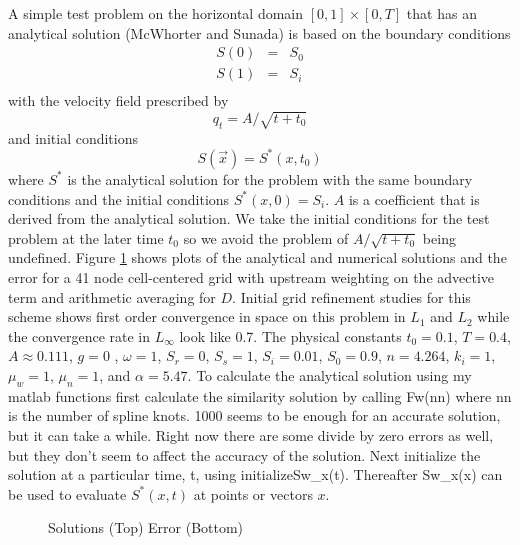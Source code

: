 \documentclass[12pt,dvips]{report}
\begin{document}
\begin{figure}
 
\end{figure}
\newpage
A simple test problem on the horizontal domain $[0,1] \times [0,T]$
that has an analytical solution (McWhorter and Sunada) is based on the
boundary conditions
\begin{eqnarray}
S(0) &=& S_0 \\
S(1) &=& S_i \\
\end{eqnarray}
with the velocity field prescribed by 
\begin{equation}
q_t = A/\sqrt{t+t_0}
\end{equation}
and initial conditions
\begin{equation}
S(\vec x) = S^{*}(x,t_0)
\end{equation}
where $S^{*}$ is the analytical solution for the problem with the same
boundary conditions and the initial conditions $S^{*}(x,0) = S_i$. $A$
is a coefficient that is derived from the analytical solution. We take
the initial conditions for the test problem at the later time $t_0$ so
we avoid the problem of $A/\sqrt{t+t_0}$ being undefined. Figure
\ref{example1} shows plots of the analytical and numerical solutions
and the error for a 41 node cell-centered grid with upstream weighting
on the advective term and arithmetic averaging for $D$. Initial grid
refinement studies for this scheme shows first order convergence in
space on this problem in $L_1$ and $L_2$ while the convergence rate in
$L_{\infty}$ look like 0.7. The physical constants $t_0=0.1$, $T=0.4$,
$A \approx 0.111$, $g = 0$ , $\omega = 1$, $S_r = 0$, $ S_s = 1$,
$S_i=0.01$, $ S_0=0.9$, $n=4.264$, $k_i=1$, $\mu_w=1$, $\mu_n=1$, and
$\alpha=5.47$. To calculate the analytical solution using my matlab
functions first calculate the similarity solution by calling Fw(nn)
where nn is the number of spline knots.  1000 seems to be enough for
an accurate solution, but it can take a while. Right now there are
some divide by zero errors as well, but they don't seem to affect the
accuracy of the solution. Next initialize the solution at a particular
time, t, using initializeSw\_x(t). Thereafter Sw\_x(x) can be used to
evaluate $S^{*}(x,t)$ at points or vectors $x$.
\begin{figure}
\caption{Solutions (Top) Error (Bottom) \label{example1}}
\end{figure}
\end{document}
